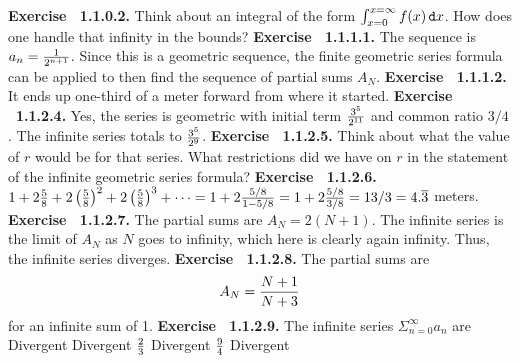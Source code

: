 \par 
 {\noindent \protect \bf  Exercise ~1.1.0.2.} Think about an integral of the form $\intop _{x=0}^{x=\infty }f(x)\mathop {}\protect \tmspace  -\thinmuskip {.1667em}\protect \mathtt  {d}x $. How does one handle that infinity in the bounds? \protect \newline  \protect \newline  
 {\noindent \protect \bf  Exercise ~1.1.1.1.} The sequence is $a_n=\protect \frac  {1}{2^{n+1}}$. Since this is a geometric sequence, the finite geometric series formula can be applied to then find the sequence of partial sums $A_N$. \protect \newline  \protect \newline  
 {\noindent \protect \bf  Exercise ~1.1.1.2.} It ends up one-third of a meter forward from where it started. \protect \newline  \protect \newline  
 {\noindent \protect \bf  Exercise ~1.1.2.4.} Yes, the series is geometric with initial term $\protect \frac  {3^5}{2^{11}}$ and common ratio $3/4$. The infinite series totals to $ \protect \frac  {3^5}{2^9}$. \protect \newline  \protect \newline  
 {\noindent \protect \bf  Exercise ~1.1.2.5.} Think about what the value of $r$ would be for that series. What restrictions did we have on $r$ in the statement of the infinite geometric series formula? \protect \newline  \protect \newline  
 {\noindent \protect \bf  Exercise ~1.1.2.6.} $1+2\protect \frac  {5}{8}+2\left (\protect \frac  {5}{8}\right )^2+2\left (\protect \frac  {5}{8}\right )^3+\protect \cdots  =1+2\protect \frac  {5/8}{1-5/8}=1+2\protect \frac  {5/8}{3/8}=13/3=4.\protect \overline  {3}$ meters. \protect \newline  \protect \newline  
 {\noindent \protect \bf  Exercise ~1.1.2.7.} The partial sums are $A_N=2(N+1)$. The infinite series is the limit of $A_N$ as $N$ goes to infinity, which here is clearly again infinity. Thus, the infinite series diverges. \protect \newline  \protect \newline  
 {\noindent \protect \bf  Exercise ~1.1.2.8.} The partial sums are $$A_N=\protect \frac  {N+1}{N+3}$$ for an infinite sum of 1. \protect \newline  \protect \newline  
 {\noindent \protect \bf  Exercise ~1.1.2.9.} The infinite series $\Sigma _{n=0}^{\infty }a_n$ are \textbullet Divergent \textbullet Divergent  \textbullet $\protect \frac  {2}{3}$ \textbullet Divergent \textbullet $\protect \frac  {9}{4}$ \textbullet Divergent  \protect \newline  \protect \newline  

